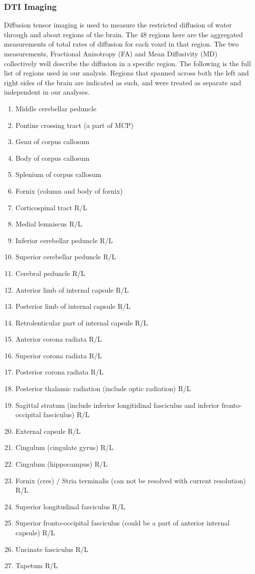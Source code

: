 \newpage

\subsubsection{DTI Imaging}
Diffusion tensor imaging is used to measure the restricted diffusion of water through and about regions of the brain. The 48 regions here are the aggregated measurements of total rates of diffusion for each voxel in that region. The two measurements, Fractional Anisotropy (FA) and Mean Diffusivity (MD) collectively well describe the diffusion in a specific region. The following is the full list of regions used in our analysis. Regions that spanned across both the left and right sides of the brain are indicated as such, and were treated as separate and independent in our analyses. 
{\small
\begin{multicols}{2}
\begin{enumerate}
\item Middle cerebellar peduncle
\item Pontine crossing tract (a part of MCP)
\item Genu of corpus callosum
\item Body of corpus callosum
\item Splenium of corpus callosum
\item Fornix (column and body of fornix)
\item Corticospinal tract R/L
\item Medial lemniscus R/L
\item Inferior cerebellar peduncle R/L
\item Superior cerebellar peduncle R/L
\item Cerebral peduncle R/L
\item Anterior limb of internal capsule R/L
\item Posterior limb of internal capsule R/L
\item Retrolenticular part of internal capsule R/L
\item Anterior corona radiata R/L
\item Superior corona radiata R/L
\item Posterior corona radiata R/L
\item Posterior thalamic radiation (include optic radiation) R/L
\item Sagittal stratum (include inferior longitidinal fasciculus and inferior fronto-occipital fasciculus) R/L
\item External capsule R/L
\item Cingulum (cingulate gyrus) R/L
\item Cingulum (hippocampus) R/L
\item Fornix (cres) / Stria terminalis (can not be resolved with current resolution) R/L
\item Superior longitudinal fasciculus R/L
\item Superior fronto-occipital fasciculus (could be a part of anterior internal capsule) R/L
\item Uncinate fasciculus R/L
\item Tapetum R/L
\end{enumerate}
\end{multicols}
}
